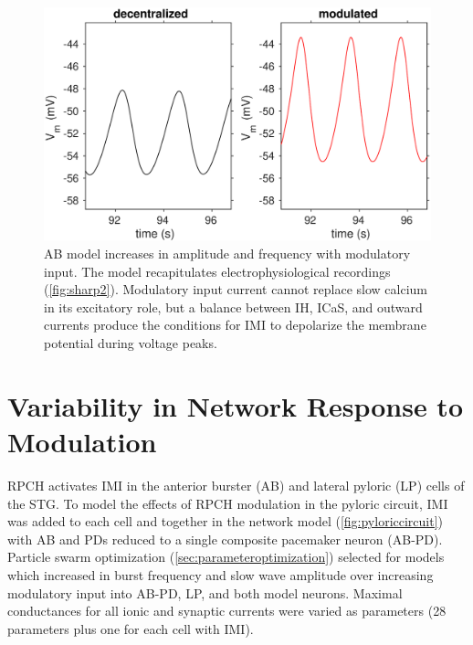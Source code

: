 \begin{figure}
	\centering
	\includegraphics[width=1.0\linewidth]{gfx/prinz-models/ABwmod2}
	\caption[Superimposed model AB traces]{\acs{AB} model increases in amplitude and frequency with modulatory input. The model recapitulates electrophysiological recordings (\autoref{fig:sharp2}). Modulatory input current cannot replace slow calcium in its excitatory role, but a balance between \acs{IH}, \acs{ICaS}, and outward currents produce the conditions for \acs{IMI} to depolarize the membrane potential during voltage peaks.}
	\label{fig:abwmod}
\end{figure}

\FloatBarrier

\section{Variability in Network Response to Modulation}
\acs{RPCH} activates \ac{IMI} in the anterior burster (\acs{AB}) and lateral pyloric (\acs{LP}) cells of the \acs{STG}\autocite{NusbaumNeuronalRoleCrustacean1988}. To model the effects of \acs{RPCH} modulation in the pyloric circuit, \acs{IMI} was added to each cell and together in the network model (\autoref{fig:pyloriccircuit}) with \acs{AB} and \acsp{PD} reduced to a single composite pacemaker neuron (\acs{AB}-\acs{PD}). Particle swarm optimization (\autoref{sec:parameteroptimization}) selected for models which increased in burst frequency and slow wave amplitude over increasing modulatory input into \acs{AB}-\acs{PD}, \acs{LP}, and both model neurons. Maximal conductances for all ionic and synaptic currents were varied as parameters (28 parameters plus one for each cell with \acs{IMI}).

